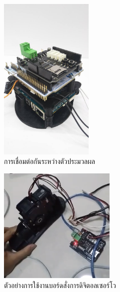 \begin{figure}[!ht]
    \centering
    \includegraphics[width=0.4\textwidth]{chapter3/images/uthai_controller.jpg}
    \caption{การเชื่อมต่อกันระหว่างตัวประมวลผล}
    \label{fig:uthai_controller}
\end{figure}
\begin{figure}[!ht]
    \centering
    \includegraphics[width=0.5\textwidth]{chapter3/images/clean/uthai_drive.png}
    \caption{ตัวอย่างการใช้งานบอร์ดสั่งการดิจิตอลเซอร์โว}
    \label{fig:uthai_drive}
\end{figure}





